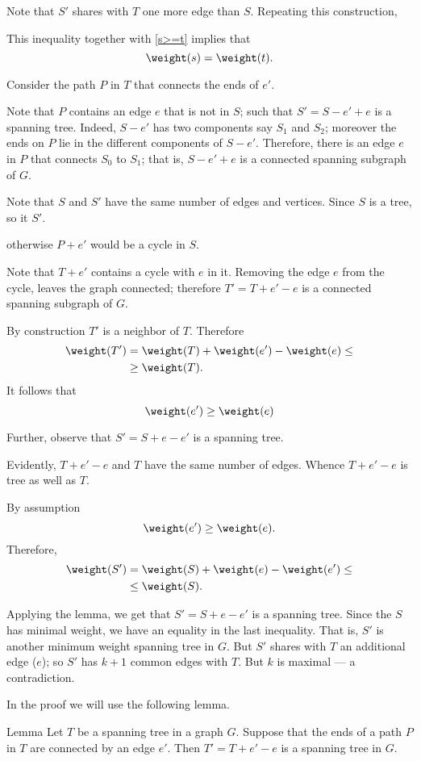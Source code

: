 Note that $S'$ shares with $T$ one more edge than $S$.
Repeating this construction,

This inequality together with \ref{s>=t} implies that
\[\weight(s)= \weight(t).\]

Consider the path $P$ in $T$ that connects the ends of $e'$.

Note that $P$ contains an edge $e$ that is not in $S$;
such that $S'=S-e'+e$ is a spanning tree.
Indeed, $S-e'$ has two components say $S_1$ and $S_2$;
moreover the ends on $P$ lie in the different components of $S-e'$.
Therefore, there is an edge $e$ in $P$ that connects $S_0$ to $S_1$;
that is, $S-e'+e$ is a connected spanning subgraph of $G$.

Note that $S$ and $S'$ have the same number of edges and vertices.
Since $S$ is a tree, so it $S'$.

otherwise $P+e'$ would be a cycle in $S$.

Note that  $T+e'$ contains a cycle with $e$ in it.
Removing the edge $e$ from the cycle, leaves the graph connected;
therefore $T'=T+e'-e$ is a connected spanning subgraph of $G$.

By construction $T'$ is a neighbor of $T$.
Therefore
\begin{align*}
\weight(T')&=\weight(T)+\weight(e')-\weight(e)\le
\\
&\ge\weight(T).
\end{align*}
It follows that 
\[\weight(e')\ge\weight(e)\]

Further, observe that $S'=S+e-e'$ is a spanning tree.


Evidently, $T+e'-e$ and $T$ have the same number of edges.
Whence $T+e'-e$ is tree as well as $T$.

By assumption 
\[\weight(e')\ge \weight(e).\]
Therefore, 
\begin{align*}
\weight(S')&=\weight(S)+\weight(e)-\weight(e')\le
\\
&\le\weight(S).
\end{align*}

Applying the lemma, we get that $S'=S+e-e'$ is a spanning tree.
Since the $S$ has minimal weight, we have an equality in the last inequality.
That is, $S'$ is another minimum weight spanning tree in $G$.
But $S'$ shares with $T$ an additional edge ($e$);
so $S'$ has $k+1$ common edges with $T$.
But $k$ is maximal --- a contradiction.
\qeds
\qeds

In the proof we will use the following lemma.

\begin{thm}{Lemma}
Let $T$ be a spanning tree in a graph $G$.
Suppose that the ends of a path $P$ in $T$ are connected by an edge $e'$.
Then $T'=T+e'-e$ is a spanning tree in $G$.
\end{thm}

